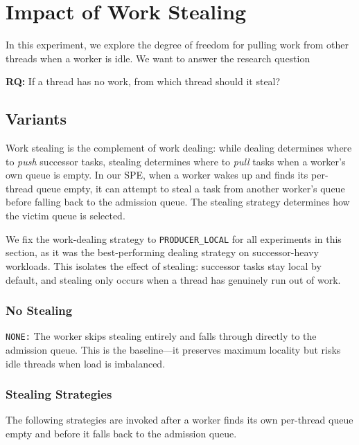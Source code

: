 \section{Impact of Work Stealing}
In this experiment, we explore the degree of freedom for pulling work from other threads when a worker is idle. We want to answer the research question

\begin{tcolorbox}[colback=blue!5, colframe=blue!40!black, title=Research Questions]
    \textbf{RQ:} If a thread has no work, from which thread should it steal?
\end{tcolorbox}

\subsection{Variants}
Work stealing is the complement of work dealing: while dealing determines where to \emph{push} successor tasks, stealing determines where to \emph{pull} tasks when a worker's own queue is empty.
In our SPE, when a worker wakes up and finds its per-thread queue empty, it can attempt to steal a task from another worker's queue before falling back to the admission queue.
The stealing strategy determines how the victim queue is selected.

We fix the work-dealing strategy to \texttt{PRODUCER\_LOCAL} for all experiments in this section, as it was the best-performing dealing strategy on successor-heavy workloads.
This isolates the effect of stealing: successor tasks stay local by default, and stealing only occurs when a thread has genuinely run out of work.

\subsubsection{No Stealing}
\texttt{NONE:}
The worker skips stealing entirely and falls through directly to the admission queue.
This is the baseline---it preserves maximum locality but risks idle threads when load is imbalanced.

\subsubsection{Stealing Strategies}
The following strategies are invoked after a worker finds its own per-thread queue empty and before it falls back to the admission queue.

